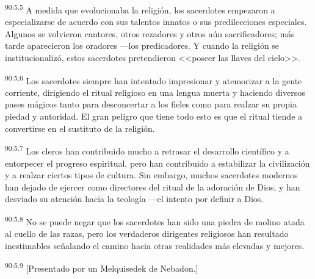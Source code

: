 \par
\textsuperscript{90:5.5} A medida que evolucionaba la religión, los sacerdotes empezaron a especializarse de acuerdo con sus talentos innatos o sus predilecciones especiales. Algunos se volvieron cantores, otros rezadores y otros aún sacrificadores; más tarde aparecieron los oradores ---los predicadores. Y cuando la religión se institucionalizó, estos sacerdotes pretendieron <<poseer las llaves del cielo>>.

\par
\textsuperscript{90:5.6} Los sacerdotes siempre han intentado impresionar y atemorizar a la gente corriente, dirigiendo el ritual religioso en una lengua muerta y haciendo diversos pases mágicos tanto para desconcertar a los fieles como para realzar su propia piedad y autoridad. El gran peligro que tiene todo esto es que el ritual tiende a convertirse en el sustituto de la religión.

\par
\textsuperscript{90:5.7} Los cleros han contribuido mucho a retrasar el desarrollo científico y a entorpecer el progreso espiritual, pero han contribuido a estabilizar la civilización y a realzar ciertos tipos de cultura. Sin embargo, muchos sacerdotes modernos han dejado de ejercer como directores del ritual de la adoración de Dios, y han desviado su atención hacia la teología ---el intento por definir a Dios.

\par
\textsuperscript{90:5.8} No se puede negar que los sacerdotes han sido una piedra de molino atada al cuello de las razas, pero los verdaderos dirigentes religiosos han resultado inestimables señalando el camino hacia otras realidades más elevadas y mejores.

\par
\textsuperscript{90:5.9} [Presentado por un Melquisedek de Nebadon.]
